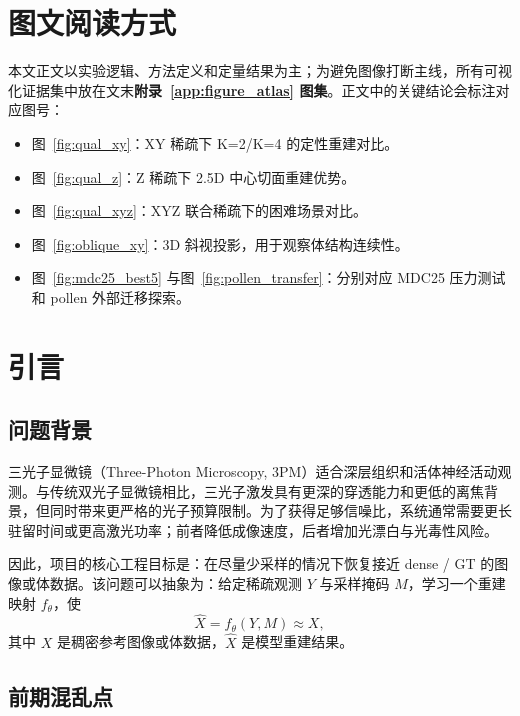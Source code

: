 \documentclass[UTF8, scheme=plain, 11pt, a4paper]{ctexart}
\begin{document}
\section*{图文阅读方式}

本文正文以实验逻辑、方法定义和定量结果为主；为避免图像打断主线，所有可视化证据集中放在文末\textbf{附录~\ref{app:figure_atlas} 图集}。正文中的关键结论会标注对应图号：

\begin{itemize}[leftmargin=*]
  \item 图~\ref{fig:qual_xy}：XY 稀疏下 K=2/K=4 的定性重建对比。
  \item 图~\ref{fig:qual_z}：Z 稀疏下 2.5D 中心切面重建优势。
  \item 图~\ref{fig:qual_xyz}：XYZ 联合稀疏下的困难场景对比。
  \item 图~\ref{fig:oblique_xy}：3D 斜视投影，用于观察体结构连续性。
  \item 图~\ref{fig:mdc25_best5} 与图~\ref{fig:pollen_transfer}：分别对应 MDC25 压力测试和 pollen 外部迁移探索。
\end{itemize}

\section{引言}

\subsection{问题背景}

三光子显微镜（Three-Photon Microscopy, 3PM）适合深层组织和活体神经活动观测。与传统双光子显微镜相比，三光子激发具有更深的穿透能力和更低的离焦背景，但同时带来更严格的光子预算限制。为了获得足够信噪比，系统通常需要更长驻留时间或更高激光功率；前者降低成像速度，后者增加光漂白与光毒性风险。

因此，项目的核心工程目标是：在尽量少采样的情况下恢复接近 dense / GT 的图像或体数据。该问题可以抽象为：给定稀疏观测 $Y$ 与采样掩码 $M$，学习一个重建映射 $f_\theta$，使
\begin{equation}
  \hat{X} = f_\theta(Y, M) \approx X,
\end{equation}
其中 $X$ 是稠密参考图像或体数据，$\hat{X}$ 是模型重建结果。

\subsection{前期混乱点}
\end{document}
